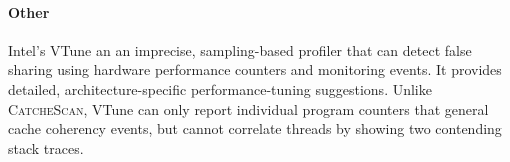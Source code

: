 \documentclass{sig-alternate}
\newcommand{\TextToolname}{CatcheScan}
\newcommand{\Toolname}{\textsc{\TextToolname{}}}
\begin{document}
\paragraph{Other}

Intel's VTune \cite{IntelVTune} an an imprecise, sampling-based profiler that can detect false sharing using hardware performance
counters and monitoring events. It provides detailed, architecture-specific performance-tuning suggestions. Unlike \Toolname{},
VTune can only report individual program counters that general cache coherency events, but cannot correlate threads by showing
two contending stack traces.

%
%





\end{document}
